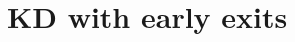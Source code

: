 \documentclass[aspectratio=169,xcolor=dvipsnames]{beamer}
\begin{document}

\section{KD with early exits}
\end{document}
